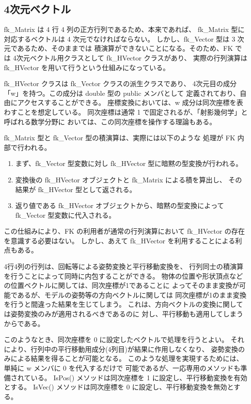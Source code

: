\subsection{4次元ベクトル}
fk\_Matrix は 4 行 4 列の正方行列であるため、本来であれば、
fk\_Matrix 型に対応するベクトルは 4 次元でなければならない。
しかし、fk\_Vector 型は 3 次元であるため、そのままでは
積演算ができないことになる。そのため、FK では
4次元ベクトル用クラスとして fk\_HVector クラスがあり、
実際の行列演算は fk\_HVector を用いて行うという仕組みになっている。

fk\_HVector クラスは fk\_Vector クラスの派生クラスであり、
4次元目の成分「w」を持つ。この成分は double 型の public メンバとして
定義されており、自由にアクセスすることができる。
座標変換においては、w 成分は同次座標を表わすことを想定している。
同次座標は通常 1 で固定されるが、「射影幾何学」と呼ばれる数学分野に
おいては、この同次座標を操作する理論もある。

fk\_Matrix 型と fk\_Vector 型の積演算は、実際には以下のような
処理が FK 内部で行われる。
\begin{enumerate}
 \item まず、fk\_Vector 型変数に対し fk\_HVector 型に暗黙の型変換が行われる。
 \item 変換後の fk\_HVector オブジェクトと fk\_Matrix による積を算出し、
	その結果が fk\_HVector 型として返される。
 \item 返り値である fk\_HVector オブジェクトから、暗黙の型変換によって
	fk\_Vector 型変数に代入される。
\end{enumerate}
この仕組みにより、FK の利用者が通常の行列演算において
fk\_HVector の存在を意識する必要はない。
しかし、あえて fk\_HVector を利用することによる利点もある。

4行4列の行列は、回転等による姿勢変換と平行移動変換を、
行列同士の積演算を行うことによって同時に内包することができる。
物体の位置や形状頂点などの位置ベクトルに関しては、同次座標が1であることに
よってそのまま変換が可能であるが、モデルの姿勢等の方向ベクトルに関しては
同次座標が1のまま変換を行うと間違った結果を生じてしまう。
これは、方向ベクトルの変換に関しては姿勢変換のみが適用されるべきであるのに
対し、平行移動も適用してしまうからである。

このようなとき、同次座標を 0 に設定したベクトルで処理を行うとよい。
それにより、行列中の平行移動用成分(4列目)が結果に作用しなくなり、
姿勢変換のみによる結果を得ることが可能となる。
このような処理を実現するためには、単純に w メンバに 0 を代入するだけで
可能であるが、一応専用のメソッドも準備されている。
IsPos() メソッドは同次座標を 1 に設定し、平行移動変換を有効とする。
IsVec() メソッドは同次座標を 0 に設定し、平行移動変換を無効とする。

